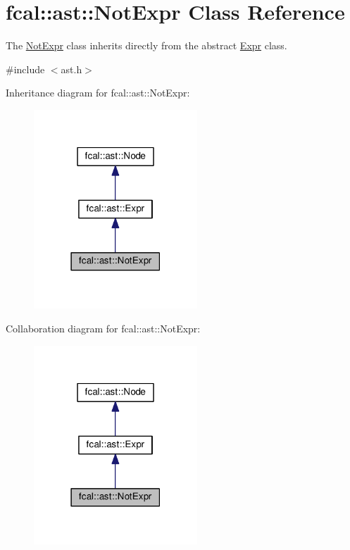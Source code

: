 \hypertarget{classfcal_1_1ast_1_1NotExpr}{}\section{fcal\+:\+:ast\+:\+:Not\+Expr Class Reference}
\label{classfcal_1_1ast_1_1NotExpr}


The \hyperlink{classfcal_1_1ast_1_1NotExpr}{Not\+Expr} class inherits directly from the abstract \hyperlink{classfcal_1_1ast_1_1Expr}{Expr} class.  




{\ttfamily \#include $<$ast.\+h$>$}



Inheritance diagram for fcal\+:\+:ast\+:\+:Not\+Expr\+:
\nopagebreak
\begin{figure}[H]
\begin{center}
\leavevmode
\includegraphics[width=174pt]{classfcal_1_1ast_1_1NotExpr__inherit__graph}
\end{center}
\end{figure}


Collaboration diagram for fcal\+:\+:ast\+:\+:Not\+Expr\+:
\nopagebreak
\begin{figure}[H]
\begin{center}
\leavevmode
\includegraphics[width=174pt]{classfcal_1_1ast_1_1NotExpr__coll__graph}
\end{center}
\end{figure}
